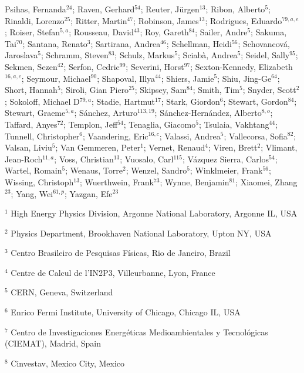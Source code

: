 Psihas, Fernanda$^{24}$;
Raven, Gerhard$^{54}$;
Reuter, Jürgen$^{13}$;
Ribon, Alberto$^{5}$;
Rinaldi, Lorenzo$^{25}$;
Ritter, Martin$^{47}$;
Robinson, James$^{13}$;
Rodrigues, Eduardo$^{79,a,e}$;
Roiser, Stefan$^{5,a}$;
Rousseau, David$^{43}$;
Roy, Gareth$^{84}$;
Sailer, Andre$^{5}$;
Sakuma, Tai$^{70}$;
Santana, Renato$^{3}$;
Sartirana, Andrea$^{46}$;
Schellman, Heidi$^{56}$;
Schovancová, Jaroslava$^{5}$;
Schramm, Steven$^{83}$;
Schulz, Markus$^{5}$;
Sciabà, Andrea$^{5}$;
Seidel, Sally$^{95}$;
Sekmen, Sezen$^{42}$;
Serfon, Cedric$^{99}$;
Severini, Horst$^{97}$;
Sexton-Kennedy, Elizabeth$^{16,a,c}$;
Seymour, Michael$^{90}$;
Shapoval, Illya$^{44}$;
Shiers, Jamie$^{5}$;
Shiu, Jing-Ge$^{64}$;
Short, Hannah$^{5}$;
Siroli, Gian Piero$^{25}$;
Skipsey, Sam$^{84}$;
Smith, Tim$^{5}$;
Snyder, Scott$^{2}$;
Sokoloff, Michael D$^{79,a}$;
Stadie, Hartmut$^{17}$;
Stark, Giordon$^{6}$;
Stewart, Gordon$^{84}$;
Stewart, Graeme$^{5,a}$;
Sánchez, Arturo$^{113,19}$;
Sánchez-Hernández, Alberto$^{8,o}$;
Taffard, Anyes$^{72}$;
Templon, Jeff$^{54}$;
Tenaglia, Giacomo$^{5}$;
Tsulaia, Vakhtang$^{44}$;
Tunnell, Christopher$^{6}$;
Vaandering, Eric$^{16,c}$;
Valassi, Andrea$^{5}$;
Vallecorsa, Sofia$^{82}$;
Valsan, Liviu$^{5}$;
Van Gemmeren, Peter$^{1}$;
Vernet, Renaud$^{4}$;
Viren, Brett$^{2}$;
Vlimant, Jean-Roch$^{11,a}$;
Voss, Christian$^{13}$;
Vuosalo, Carl$^{115}$;
Vázquez Sierra, Carlos$^{54}$;
Wartel, Romain$^{5}$;
Wenaus, Torre$^{2}$;
Wenzel, Sandro$^{5}$;
Winklmeier, Frank$^{56}$;
Wissing, Christoph$^{13}$;
Wuerthwein, Frank$^{73}$;
Wynne, Benjamin$^{81}$;
Xiaomei, Zhang$^{23}$;
Yang, Wei$^{61,p}$;
Yazgan, Efe$^{23}$
\bigskip
\par {\footnotesize $^{1}$ High Energy Physics Division, Argonne National Laboratory, Argonne IL, USA}
\par {\footnotesize $^{2}$ Physics Department, Brookhaven National Laboratory, Upton NY, USA}
\par {\footnotesize $^{3}$ Centro Brasileiro de Pesquisas Físicas, Rio de Janeiro, Brazil}
\par {\footnotesize $^{4}$ Centre de Calcul de l’IN2P3, Villeurbanne, Lyon, France}
\par {\footnotesize $^{5}$ CERN, Geneva, Switzerland}
\par {\footnotesize $^{6}$ Enrico Fermi Institute, University of Chicago, Chicago IL, USA}
\par {\footnotesize $^{7}$ Centro de Investigaciones Energéticas Medioambientales y Tecnológicas (CIEMAT), Madrid, Spain}
\par {\footnotesize $^{8}$ Cinvestav, Mexico City, Mexico}

